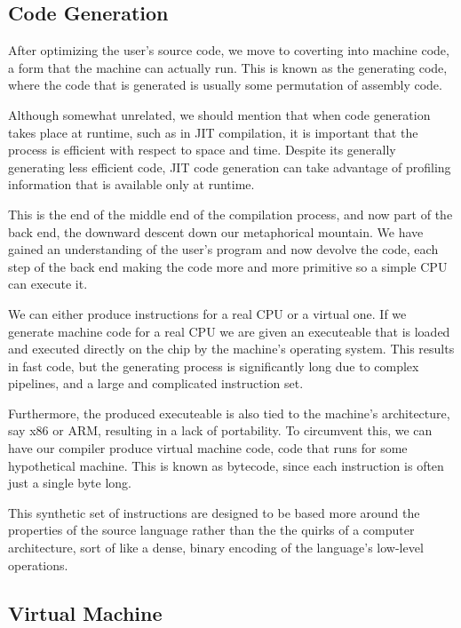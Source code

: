 {\subsection{Code Generation}

After optimizing the user's source code, we move to coverting into machine code, a form that the machine can actually run. This is known as the generating code, where the code that is generated is usually some permutation of assembly code. 

Although somewhat unrelated, we should mention that when code generation takes place at runtime, such as in \ac{JIT} compilation, it is important that the process is efficient with respect to space and time. Despite its generally generating less efficient code, \ac{JIT} code generation can take advantage of profiling information that is available only at runtime.

This is the end of the middle end of the compilation process, and now part of the back end, the downward descent down our metaphorical mountain. We have gained an understanding of the user's program and now devolve the code, each step of the back end making the code more and more primitive so a simple \ac{CPU} can execute it. 

We can either produce instructions for a real \ac{CPU} or a virtual one. If we generate machine code for a real \ac{CPU} we are given an executeable that is loaded and executed directly on the chip by the machine's operating system. This results in fast code, but the generating process is significantly long due to complex pipelines, and a large and complicated instruction set. 
 
Furthermore, the produced executeable is also tied to the machine's architecture, say x86 or ARM, resulting in a lack of portability. To circumvent this, we can have our compiler produce virtual machine code, code that runs for some hypothetical machine. This is known as bytecode, since each instruction is often just a single byte long.

This synthetic set of instructions are designed to be based more around the properties of the source language rather than the the quirks of a computer architecture, sort of like a dense, binary encoding of the language’s low-level operations. 

\subsection{Virtual Machine}

}

